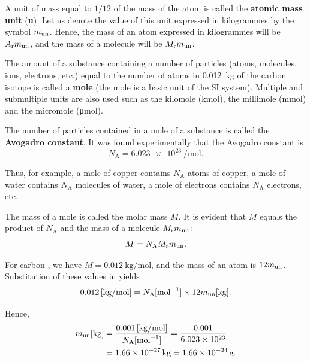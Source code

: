 A unit of mass equal to $1/12$ of the mass of the atom  is called the \textbf{atomic mass unit} (\textbf{\si{\atomicmassunit}}). Let us denote the value of this unit expressed in kilogrammes by the symbol $m_{\text{un}}$. Hence, the mass of an atom expressed in kilogrammes will be $A_{\text{r}}m_{\text{un}}$, and the mass of a molecule will be $M_{\text{r}}m_{\text{un}}$.

The amount of a substance containing a number of particles (atoms, molecules, ions, electrons, etc.) equal to the number of atoms in \SI{0.012}{\kilo\gram} of the carbon isotope  is called a \textbf{mole} (the mole is a basic unit of the SI system). Multiple and submultiple units are also used such as the kilomole (\si{\kilo\mole}), the millimole (\si{\milli\mole}) and the micromole (\si{\micro\mole}).

The number of particles contained in a mole of a substance is called the \textbf{Avogadro constant}. It was found experimentally that the Avogadro constant is
\begin{equation}\label{eq:10_1}
	N_{\text{A}} = \SI{6.023e23}{\per\mole}.
\end{equation}

\noindent
Thus, for example, a mole of copper contains $N_{\text{A}}$ atoms of copper, a mole of water contains $N_{\text{A}}$ molecules of water, a mole of electrons contains $N_{\text{A}}$ electrons, etc.

The mass of a mole is called the molar mass $M$. It is evident that $M$ equals the product of $N_{\text{A}}$ and the mass of a molecule $M_{\text{r}}m_{\text{un}}$:
\begin{equation}\label{eq:10_2}
	M = N_{\text{A}}M_{\text{r}}m_{\text{un}}.
\end{equation}

For carbon , we have $M=\SI{0.012}{\kilo\gram\per\mole}$, and the mass of an atom is $12m_{\text{un}}$. Substitution of these values in  yields
\begin{equation*}
	\SI{0.012}{[\kilo\gram\per\mole]} = N_{\text{A}} [\si{\per\mole}] \times 12m_{\text{un}} [\si{\kilo\gram}].
\end{equation*}

\noindent
Hence,
\begin{align}
	m_{\text{un}} [\si{\kilo\gram}] &= \frac{\SI{0.001}{[\kilo\gram\per\mole]}}{N_{\text{A}} [\si{\per\mole}]} = \frac{0.001}{\num{6.023e23}}\nonumber\\
	&= \SI{1.66e-27}{\kilo\gram} = \SI{1.66e-24}{\gram}.\label{eq:10_3}
\end{align}

